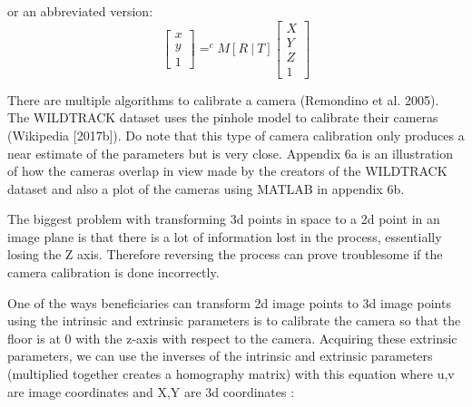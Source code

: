 \documentclass[12pt]{report}
\begin{document}
or an abbreviated version:
\begin{equation*}
\begin{bmatrix}
x \\
y \\
1
\end{bmatrix}
= ^{c}M[R \ |\ T]
\begin{bmatrix}
X \\
Y \\
Z \\
1
\end{bmatrix}
\end{equation*}


There are multiple algorithms to calibrate a camera (Remondino et al. 2005). The WILDTRACK dataset uses the pinhole model to calibrate their cameras (Wikipedia [2017b]). Do note that this type of camera calibration only produces a near estimate of the parameters but is very close. Appendix 6a is an illustration of how the cameras overlap in view made by the creators of the WILDTRACK dataset and also a plot of the cameras using MATLAB in appendix 6b.

\vspace{2mm}

The biggest problem with transforming 3d points in space to a 2d point in an image plane is that there is a lot of information lost in the process, essentially losing the Z axis. Therefore reversing the process can prove troublesome if the camera calibration is done incorrectly.

\vspace{2mm}

One of the ways beneficiaries can transform 2d image points to 3d image points using the intrinsic and extrinsic parameters is to calibrate the camera so that the floor is at 0 with the z-axis with respect to the camera. Acquiring these extrinsic parameters, we can use the inverses of the intrinsic and extrinsic parameters (multiplied together creates a homography matrix) with this equation where u,v are image coordinates and X,Y are 3d coordinates :
\end{document}
